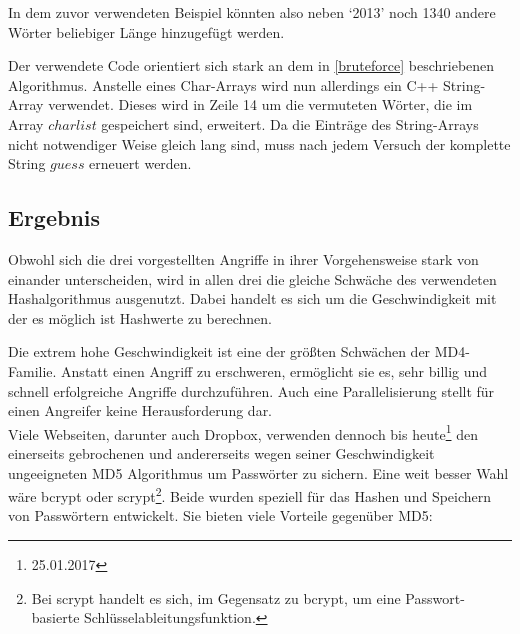 \documentclass[12pt,a4paper]{scrartcl}
\numberwithin{equation}{section}
\numberwithin{myalgctr}{section}
\numberwithin{mytheoremctr}{section}
\begin{document}
	In dem zuvor verwendeten Beispiel könnten also neben \textquoteleft 2013\textquoteright{} noch 1340 andere Wörter beliebiger Länge hinzugefügt werden.\\
\vspace{1cm}
	\par\noindent
	Der verwendete Code orientiert sich stark an dem in \cref{bruteforce} beschriebenen Algorithmus. Anstelle eines Char-Arrays wird nun allerdings ein C++ String-Array verwendet. Dieses wird in Zeile 14 um die vermuteten Wörter, die im Array $charlist$ gespeichert sind, erweitert. Da die Einträge des String-Arrays nicht notwendiger Weise gleich lang sind, muss nach jedem Versuch der komplette String $guess$ erneuert werden.
	\newpage
	
	
	\newpage
	\subsection{Ergebnis}
	Obwohl sich die drei vorgestellten Angriffe in ihrer Vorgehensweise stark von einander unterscheiden, wird in allen drei die gleiche Schwäche des verwendeten Hash\-algorithmus ausgenutzt. Dabei handelt es sich um die Geschwindigkeit mit der es möglich ist Hashwerte zu berechnen. \par

	\vspace*{.5\baselineskip}\par
	\vspace*{.5\baselineskip}\noindent
	\noindent
	Die extrem hohe Geschwindigkeit ist eine der größten Schwächen der MD4-Familie. Anstatt einen Angriff zu erschweren, ermöglicht sie es, sehr billig und schnell erfolgreiche Angriffe durchzuführen. Auch eine Parallelisierung stellt für einen Angreifer keine Herausforderung dar.\\
	Viele Webseiten, darunter auch Dropbox, verwenden dennoch bis heute\footnote{25.01.2017} den einerseits gebrochenen und andererseits wegen seiner Geschwindigkeit ungeeigneten MD5 Algorithmus um Passwörter zu sichern. Eine weit besser Wahl wäre bcrypt oder scrypt\footnote{Bei scrypt handelt es sich, im Gegensatz zu bcrypt, um eine Passwort-basierte Schlüsselableitungsfunktion.}. Beide wurden speziell für das Hashen und Speichern von Passwörtern entwickelt. Sie bieten viele Vorteile gegenüber MD5:
	
\end{document}
